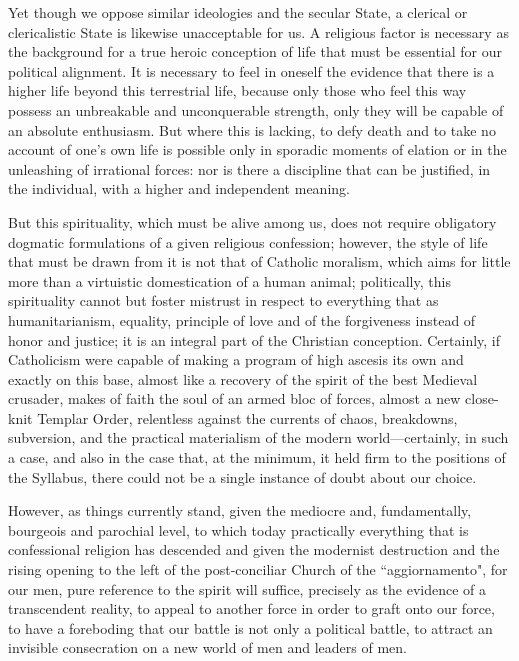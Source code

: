 Yet though we oppose similar ideologies and the secular State, a clerical or clericalistic State is likewise unacceptable for us. A religious factor is necessary as the background for a true heroic conception of life that must be essential for our political alignment. It is necessary to feel in oneself the evidence that there is a higher life beyond this terrestrial life, because only those who feel this way possess an unbreakable and unconquerable strength, only they will be capable of an absolute enthusiasm. But where this is lacking, to defy death and to take no account of one's own life is possible only in sporadic moments of elation or in the unleashing of irrational forces: nor is there a discipline that can be justified, in the individual, with a higher and independent meaning.

But this spirituality, which must be alive among us, does not require obligatory dogmatic formulations of a given religious confession; however, the style of life that must be drawn from it is not that of Catholic moralism, which aims for little more than a virtuistic domestication of a human animal; politically, this spirituality cannot but foster mistrust in respect to everything that as humanitarianism, equality, principle of love and of the forgiveness instead of honor and justice; it is an integral part of the Christian conception. Certainly, if Catholicism were capable of making a program of high ascesis its own and exactly on this base, almost like a recovery of the spirit of the best Medieval crusader, makes of faith the soul of an armed bloc of forces, almost a new close-knit Templar Order, relentless against the currents of chaos, breakdowns, subversion, and the practical materialism of the modern world—certainly, in such a case, and also in the case that, at the minimum, it held firm to the positions of the Syllabus, there could not be a single instance of doubt about our choice.

However, as things currently stand, given the mediocre and, fundamentally, bourgeois and parochial level, to which today practically everything that is confessional religion has descended and given the modernist destruction and the rising opening to the left of the post-conciliar Church of the ``aggiornamento", for our men, pure reference to the spirit will suffice, precisely as the evidence of a transcendent reality, to appeal to another force in order to graft onto our force, to have a foreboding that our battle is not only a political battle, to attract an invisible consecration on a new world of men and leaders of men.

